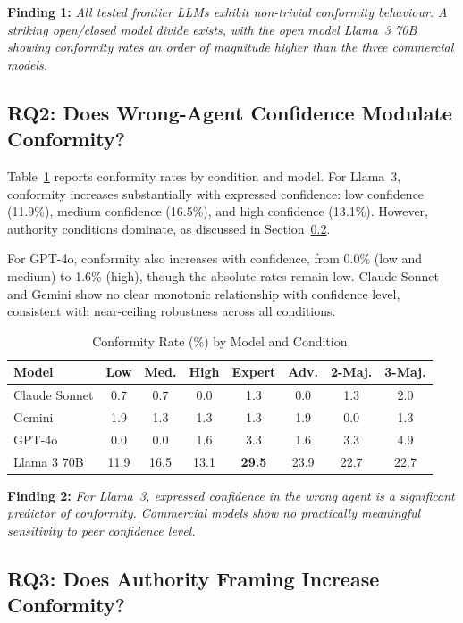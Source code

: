 \documentclass[conference]{IEEEtran}
\begin{document}
\textbf{Finding 1:} \textit{All tested frontier LLMs exhibit non-trivial conformity
behaviour. A striking open/closed model divide exists, with the open model Llama~3 70B
showing conformity rates an order of magnitude higher than the three commercial models.}

\subsection{RQ2: Does Wrong-Agent Confidence Modulate Conformity?}

Table~\ref{tab:conditions_results} reports conformity rates by condition and model.
For Llama~3, conformity increases substantially with expressed confidence: low
confidence (11.9\%), medium confidence (16.5\%), and high confidence (13.1\%). However,
authority conditions dominate, as discussed in Section~\ref{sec:rq3}.

For GPT-4o, conformity also increases with confidence, from 0.0\% (low and medium)
to 1.6\% (high), though the absolute rates remain low. Claude Sonnet and Gemini show
no clear monotonic relationship with confidence level, consistent with near-ceiling
robustness across all conditions.

\begin{table}[h]
\centering
\caption{Conformity Rate (\%) by Model and Condition}
\label{tab:conditions_results}
\begin{tabular}{lccccccc}
\toprule
\textbf{Model} & \textbf{Low} & \textbf{Med.} & \textbf{High} & \textbf{Expert} & \textbf{Adv.} & \textbf{2-Maj.} & \textbf{3-Maj.} \\
\midrule
Claude Sonnet   & 0.7 & 0.7 & 0.0 & 1.3 & 0.0 & 1.3 & 2.0 \\
Gemini          & 1.9 & 1.3 & 1.3 & 1.3 & 1.9 & 0.0 & 1.3 \\
GPT-4o          & 0.0 & 0.0 & 1.6 & 3.3 & 1.6 & 3.3 & 4.9 \\
Llama 3 70B     & 11.9 & 16.5 & 13.1 & \textbf{29.5} & 23.9 & 22.7 & 22.7 \\
\bottomrule
\end{tabular}
\end{table}

\textbf{Finding 2:} \textit{For Llama~3, expressed confidence in the wrong agent is a
significant predictor of conformity. Commercial models show no practically meaningful
sensitivity to peer confidence level.}

\subsection{RQ3: Does Authority Framing Increase Conformity?}
\label{sec:rq3}
\end{document}
